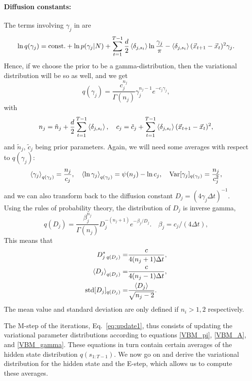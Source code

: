 \paragraph{Diffusion constants:}
The terms involving $\gamma_j$ in  are
\begin{equation}
  \ln q(\gamma_j)=\text{const.}
  +\ln p(\gamma_j|N)+\sum_{t=1}^{T-1}
  \frac d2\left\langle \delta_{j,s_t}\right\rangle\ln\frac{\gamma_j}{\pi}
  -\left\langle \delta_{j,s_t}\right\rangle(\vec{x}_{t+1}-\vec{x}_t)^2\gamma_j.
\end{equation}
Hence, if we choose the prior to be a gamma-distribution, then the
variational distribution will be so as well, and we get
\begin{equation}
  q(\gamma_j)=\frac{c_j^{n_j}}{\Gamma(n_j)}\gamma_j^{n_j-1}e^{-c_j\gamma_j},
\end{equation}
with
\begin{equation}\label{VBM_gamma}
  n_j=\tilde n_j+\frac d2\sum_{t=1}^{T-1}\left\langle \delta_{j,s_t}\right\rangle,\quad
  c_j=\tilde c_j+\sum_{t=1}^{T-1}\left\langle \delta_{j,s_t}\right\rangle(\vec{x}_{t+1}-\vec{x}_t)^2,
\end{equation}
and $\tilde n_j$, $\tilde c_j$ being prior parameters. Again, we will
need some averages with respect to $q(\gamma_j)$:
\begin{equation}\label{gammaprop}
  \left\langle \gamma_j\right\rangle_{q(\gamma_j)}=\frac{n_j}{c_j},\quad
  \left\langle \ln\gamma_j\right\rangle_{q(\gamma_j)}=\psi(n_j)-\ln c_j,\quad  
  \text{Var}[\gamma_j]_{q(\gamma_j)}=\frac{n_j}{c_j^2},
\end{equation}
and we can also transform back to the diffusion constant
$D_j=(4\gamma_j\Delta t)^{-1}$. Using the rules of probability theory,
the distribution of $D_j$ is inverse gamma,
\begin{equation}\label{eq:qD}
  q(D_j)=\frac{\beta_j^{n_j}}{\Gamma(n_j)}D_j^{-(n_j+1)}e^{-\beta_j/D_j}.
  \quad \beta_j=c_j/(4\Delta t),
\end{equation}
This means that
\begin{align}
  D^*_{j\;q(D_j)}=&\frac{c}{4(n_j+1)\Delta t},\\
  \left\langle D_j\right\rangle_{q(D_j)}=&\frac{c}{4(n_j-1)\Delta t},\\
  \text{std}[D_j]_{q(D_j)} =&\frac{\left\langle D_j\right\rangle}{\sqrt{n_j-2}}.
\end{align}
The mean value and standard deviation are only defined if $n_i>1,2$
respectively.

The M-step of the iterations, Eq.~\eqref{eq:update1}, thus consists of
updating the variational parameter distributions according to
equations \eqref{VBM_pi}, \eqref{VBM_A}, and \eqref{VBM_gamma}. These
equations in turn contain certain averages of the hidden state
distribution $q(s_{1:T-1})$. We now go on and derive the variational
distribution for the hidden state and the E-step, which allows us to
compute these averages.
